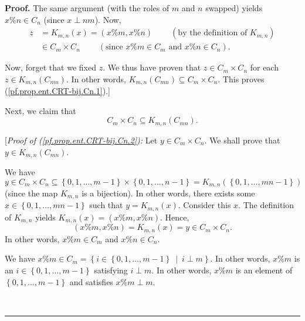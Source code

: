 \documentclass[numbers=enddot,12pt,final,onecolumn,notitlepage]{scrartcl}%
\numberwithin{exer}{subsection}
\theoremstyle{definition}
\newenvironment{proof}[1][Proof]{\noindent\textbf{#1.} }{\ \rule{0.5em}{0.5em}}
\begin{document}
\begin{proof}
The same argument (with the roles of $m$ and $n$ swapped) yields $x\%n\in
C_{n}$ (since $x\perp nm$). Now,
\begin{align*}
z  &  =K_{m,n}\left(  x\right)  =\left(  x\%m,x\%n\right)
\ \ \ \ \ \ \ \ \ \ \left(  \text{by the definition of }K_{m,n}\right) \\
&  \in C_{m}\times C_{n}\ \ \ \ \ \ \ \ \ \ \left(  \text{since }x\%m\in
C_{m}\text{ and }x\%n\in C_{n}\right)  .
\end{align*}


Now, forget that we fixed $z$. We thus have proven that $z\in C_{m}\times
C_{n}$ for each $z\in K_{m,n}\left(  C_{mn}\right)  $. In other words,
$K_{m,n}\left(  C_{mn}\right)  \subseteq C_{m}\times C_{n}$. This proves
(\ref{pf.prop.ent.CRT-bij.Cn.1}).]

Next, we claim that%
\begin{equation}
C_{m}\times C_{n}\subseteq K_{m,n}\left(  C_{mn}\right)  .
\label{pf.prop.ent.CRT-bij.Cn.2}%
\end{equation}


[\textit{Proof of (\ref{pf.prop.ent.CRT-bij.Cn.2}):} Let $y\in C_{m}\times
C_{n}$. We shall prove that $y\in K_{m,n}\left(  C_{mn}\right)  $.

We have $y\in C_{m}\times C_{n}\subseteq\left\{  0,1,\ldots,m-1\right\}
\times\left\{  0,1,\ldots,n-1\right\}  =K_{m,n}\left(  \left\{  0,1,\ldots
,mn-1\right\}  \right)  $ (since the map $K_{m,n}$ is a bijection). In other
words, there exists some $x\in\left\{  0,1,\ldots,mn-1\right\}  $ such that
$y=K_{m,n}\left(  x\right)  $. Consider this $x$. The definition of $K_{m,n}$
yields $K_{m,n}\left(  x\right)  =\left(  x\%m,x\%n\right)  $. Hence,%
\[
\left(  x\%m,x\%n\right)  =K_{m,n}\left(  x\right)  =y\in C_{m}\times C_{n}.
\]
In other words, $x\%m\in C_{m}$ and $x\%n\in C_{n}$.

We have $x\%m\in C_{m}=\left\{  i\in\left\{  0,1,\ldots,m-1\right\}
\ \mid\ i\perp m\right\}  $. In other words, $x\%m$ is an $i\in\left\{
0,1,\ldots,m-1\right\}  $ satisfying $i\perp m$. In other words, $x\%m$ is an
element of $\left\{  0,1,\ldots,m-1\right\}  $ and satisfies $x\%m\perp m$.


\end{proof}
\end{document}
